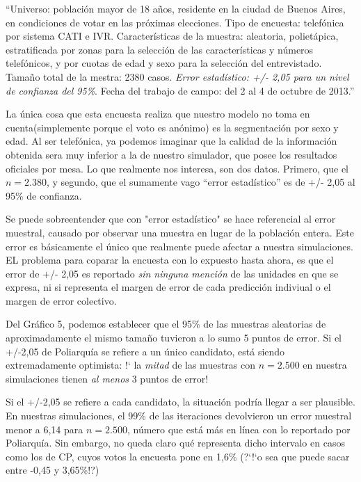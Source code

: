\documentclass[12pt, a4paper]{article}
\begin{document}
``Universo: poblaci\'on mayor de 18 a\~nos, residente en la ciudad de Buenos Aires, en condiciones de votar en las pr\'oximas elecciones. Tipo de encuesta: telef\'onica por sistema CATI e IVR. Caracter\'isticas de la muestra: aleatoria, poliet\'apica, estratificada por zonas para la selecci\'on de las caracter\'isticas y n\'umeros telef\'onicos, y por cuotas de edad y sexo para la selecci\'on del entrevistado. Tama\~no total de la mestra: 2380 casos. \emph{Error estad\'istico: +/- 2,05 para un nivel de confianza del 95\%}. Fecha del trabajo de campo: del 2 al 4 de octubre de 2013.''

La \'unica cosa que esta encuesta realiza que nuestro modelo no toma en cuenta(simplemente porque el voto es an\'onimo) es la segmentaci\'on por sexo y edad. Al ser telef\'onica, ya podemos imaginar que la calidad de la informaci\'on obtenida sera muy inferior a la de nuestro simulador, que posee los resultados oficiales por mesa.
Lo que realmente nos interesa, son dos datos. Primero, que el $n=2.380$, y segundo, que el sumamente vago ``error estad\'istico'' es de +/- 2,05 al 95\% de confianza.

Se puede sobreentender que con "error estad\'istico" se hace referencial al error muestral, causado por observar una muestra en lugar de la poblaci\'on entera. Este error es b\'asicamente el \'unico que realmente puede afectar a nuestra simulaciones. EL problema para coparar la encuesta con lo expuesto hasta ahora, es que el error de +/- 2,05 es reportado \emph{sin ninguna menci\'on} de las unidades en que se expresa, ni si representa el margen de error de cada predicci\'on indiviual o el margen de error colectivo.

Del Gr\'afico 5, podemos establecer que el 95\% de las muestras aleatorias de aproximadamente el mismo tama\~no tuvieron a lo sumo 5 puntos de error. Si el +/-2,05 de Poliarqu\'ia se refiere a un \'unico candidato, est\'a siendo extremadamente optimista: !` la \emph{mitad} de las muestras con $n=2.500$ en nuestra simulaciones tienen \emph{al menos} 3 puntos de error!

Si el +/-2,05 se refiere a cada candidato, la situaci\'on podr\'ia llegar a ser plausible. En nuestras simulaciones, el 99\% de las iteraciones devolvieron un error muestral menor a 6,14 para $n=2.500$, n\'umero que est\'a m\'as en l\'inea con lo reportado por Poliarqu\'ia. Sin embargo, no queda claro qu\'e representa dicho intervalo en casos como los de CP, cuyos votos la encuesta pone en 1,6\% (?`!`o sea que puede sacar entre -0,45 y 3,65\%!?) 
\end{document}
